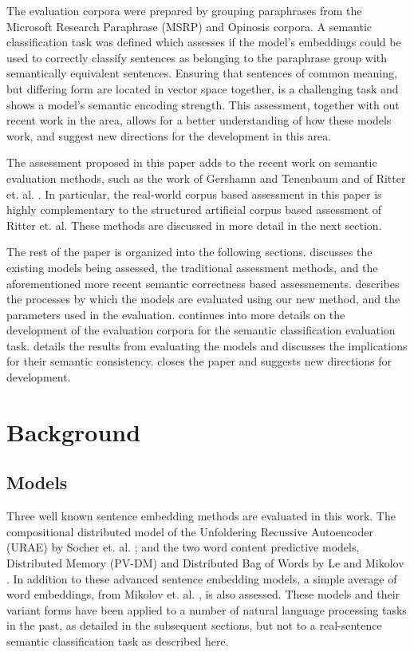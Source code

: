 \documentclass[]{book}
\begin{document}
The evaluation corpora were prepared by grouping paraphrases from
the Microsoft Research Paraphrase (MSRP) \cite{msrParapharaCorpus}
and Opinosis \cite{ganesan2010opinosis} corpora. A semantic classification
task was defined which assesses if the model's embeddings could be
used to correctly classify sentences as belonging to the paraphrase
group with semantically equivalent sentences. Ensuring that sentences
of common meaning, but differing form are located in vector space
together, is a challenging task and shows a model's semantic encoding
strength. This assessment, together with out recent work in the area,
allows for a better understanding of how these models work, and suggest
new directions for the development in this area.

The assessment proposed in this paper adds to the recent work on semantic
evaluation methods, such as the work of Gershamn and Tenenbaum \cite{gershmanphrase}
and of Ritter et. al. \cite{RitterPosition}. In particular, the real-world
corpus based assessment in this paper is highly complementary to the
structured artificial corpus based assessment of Ritter et. al. These
methods are discussed in more detail in the next section.

The rest of the paper is organized into the following sections. 
discusses the existing models being assessed, the traditional assessment
methods, and the aforementioned more recent semantic correctness based
assessnements.  describes the processes by which
the models are evaluated using our new method, and the parameters
used in the evaluation.  continues into
more details on the development of the evaluation corpora for the
semantic classification evaluation task. 
details the results from evaluating the models and discusses the implications
for their semantic consistency.  closes the paper
and suggests new directions for development.


\section{Background}

\label{sec:Background}


\subsection{Models}

Three well known sentence embedding methods are evaluated in this
work. The compositional distributed model of the Unfoldering Recussive
Autoencoder (URAE) by Socher et. al. \cite{SocherEtAl2011:PoolRAE};
and the two word content predictive models, Distributed Memory (PV-DM)
and Distributed Bag of Words by Le and Mikolov \cite{le2014distributed}.
In addition to these advanced sentence embedding models, a simple
average of word embeddings, from Mikolov et. al. \cite{mikolovSkip},
is also assessed. These models and their variant forms have been applied
to a number of natural language processing tasks in the past, as detailed
in the subsequent sections, but not to a real-sentence semantic classification
task as described here.
\end{document}
